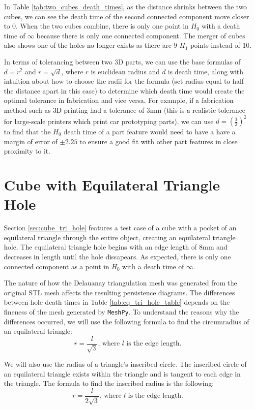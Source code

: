 \documentclass[ma]{uncgdissertationexp}
\theoremstyle{plain}
\theoremstyle{definition}
\theoremstyle{remark}
\begin{document}
\par In Table \ref{tab:two_cubes_death_times}, as the distance shrinks between the two cubes, we can see the death time of the second connected component move closer to 0. When the two cubes combine, there is only one point in $H_{0}$ with a death time of $\infty$ because there is only one connected component. The merger of cubes also shows one of the holes no longer exists as there are 9 $H_{1}$ points instead of 10.
\par In terms of tolerancing between two 3D parts, we can use the base formulas of $d=r^{2}$ and $r=\sqrt{d}$, where $r$ is euclidean radius and $d$ is death time, along with intuition about how to choose the radii for the formula (set radius equal to half the distance apart in this case) to determine which death time would create the optimal tolerance in fabrication and vice versa. For example, if a fabrication method such as 3D printing had a tolerance of 3mm (this is a realistic tolerance for large-scale printers which print car prototyping parts), we can use $d=(\mathsf{\frac{3}{2}})^{2}$ to find that the $H_{0}$ death time of a part feature would need to have a have a margin of error of $\pm 2.25$ to ensure a good fit with other part features in close proximity to it.
\newpage
\section{Cube with Equilateral Triangle Hole}
\label{sec:eq_tri_hole}
\par Section \ref{sec:cube_tri_hole} features a test case of a cube with a pocket of an equilateral triangle through the entire object, creating an equilateral triangle hole. The equilateral triangle hole begins with an edge length of 8mm and decreases in length until the hole dissapears. As expected, there is only one connected component as a point in $H_{0}$ with a death time of $\infty$.
\par The nature of how the Delauanay triangulation mesh was generated from the original STL mesh affects the resulting persistence diagrams. The differences between hole death times in Table \ref{tab:eq_tri_hole_table} depends on the fineness of the mesh generated by \verb"MeshPy". To understand the reasons why the differences occurred, we will use the following formula to find the circumradius of an equilateral triangle: 
$$r = \frac{l}{\sqrt{3}}\text{, where }l\text{ is the edge length.}$$

We will also use the radius of a triangle's inscribed circle. The inscribed circle of an equilateral triangle exists within the triangle and is tangent to each edge in the triangle. The formula to find the inscribed radius is the following:
$$r = \frac{l}{2\sqrt{3}}\text{, where }l\text{ is the edge length.}$$
\end{document}
